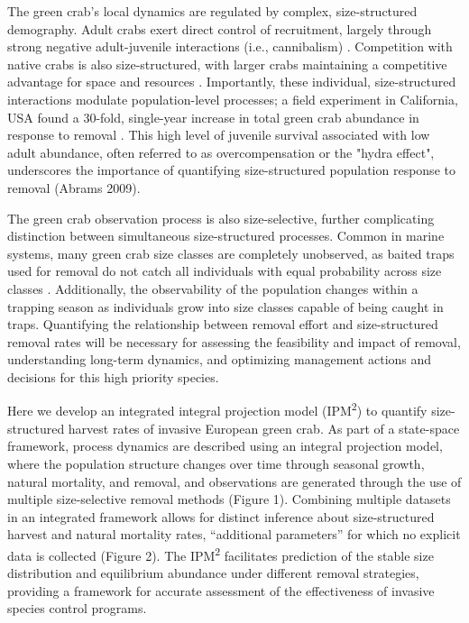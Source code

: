 \documentclass{article}
\begin{document}
The green crab’s local dynamics are regulated by complex, size-structured demography. Adult crabs exert direct control of recruitment, largely through strong negative adult-juvenile interactions (i.e., cannibalism) \parencite{grosholz2021stage, romano2017cannibalism}. Competition with native crabs is also size-structured, with larger crabs maintaining a competitive advantage for space and resources \parencite{mcdonald2001competitive, jensen2007biotic}. Importantly, these individual, size-structured interactions modulate population-level processes; a field experiment in California, USA found a 30-fold, single-year increase in total green crab abundance in response to removal \parencite{grosholz2021stage}. This high level of juvenile survival associated with low adult abundance, often referred to as overcompensation or the "hydra effect", underscores the importance of quantifying size-structured population response to removal (Abrams 2009). 

The green crab observation process is also size-selective, further complicating distinction between simultaneous size-structured processes. Common in marine systems, many green crab size classes are completely unobserved, as baited traps used for removal do not catch all individuals with equal probability across size classes \parencite{jorgensen2009size}. Additionally, the observability of the population changes within a trapping season as individuals grow into size classes capable of being caught in traps. Quantifying the relationship between removal effort and size-structured removal rates will be necessary for assessing the feasibility and impact of removal, understanding long-term dynamics, and optimizing management actions and decisions for this high priority species. 

Here we develop an integrated integral projection model (IPM\textsuperscript{2}) to quantify size-structured harvest rates of invasive European green crab. As part of a state-space framework, process dynamics are described using an integral projection model, where the population structure changes over time through seasonal growth, natural mortality, and removal, and observations are generated through the use of multiple size-selective removal methods (Figure 1). Combining multiple datasets in an integrated framework allows for distinct inference about size-structured harvest and natural mortality rates, “additional parameters” for which no explicit data is collected (Figure 2). The IPM\textsuperscript{2} facilitates prediction of the stable size distribution and equilibrium abundance under different removal strategies, providing a framework for accurate assessment of the effectiveness of invasive species control programs.
\end{document}
